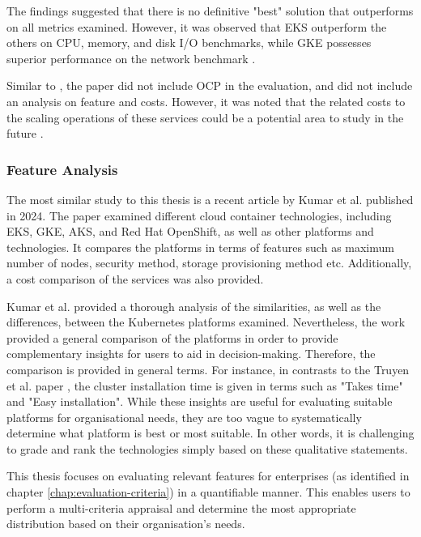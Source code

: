 The findings suggested that there is no definitive "best" solution that outperforms on all metrics examined. However, it was observed that EKS outperform the others on CPU, memory, and disk I/O benchmarks, while GKE possesses superior performance on the network benchmark \cite{pereiraferreiraPerformanceEvaluationContainers2019}.

Similar to \cite{truyenManagingFeatureCompatibility2020}, the paper did not include OCP in the evaluation, and did not include an analysis on feature and costs. However, it was noted that the related costs to the scaling operations of these services could be a potential area to study in the future \cite{pereiraferreiraPerformanceEvaluationContainers2019}.


\subsubsection{Feature Analysis}

The most similar study to this thesis is a recent article by Kumar et al. \cite{10499108} published in 2024. The paper examined different cloud container technologies, including EKS, GKE, AKS, and Red Hat OpenShift, as well as other platforms and technologies. It compares the platforms in terms of features such as maximum number of nodes, security method, storage provisioning method etc. Additionally, a cost comparison of the services was also provided.

Kumar et al. \cite{10499108} provided a thorough analysis of the similarities, as well as the differences, between the Kubernetes platforms examined. Nevertheless, the work provided a general comparison of the platforms in order to provide complementary insights for users to aid in decision-making. Therefore, the comparison is provided in general terms. For instance, in contrasts to the Truyen et al. paper \cite{truyenManagingFeatureCompatibility2020}, the cluster installation time is given in terms such as "Takes time" and "Easy installation". While these insights are useful for evaluating suitable platforms for organisational needs, they are too vague to systematically determine what platform is best or most suitable. In other words, it is challenging to grade and rank the technologies simply based on these qualitative statements.

This thesis focuses on evaluating relevant features for enterprises (as identified in chapter \ref{chap:evaluation-criteria}) in a quantifiable manner. This enables users to perform a multi-criteria appraisal and determine the most appropriate distribution based on their organisation's needs.

